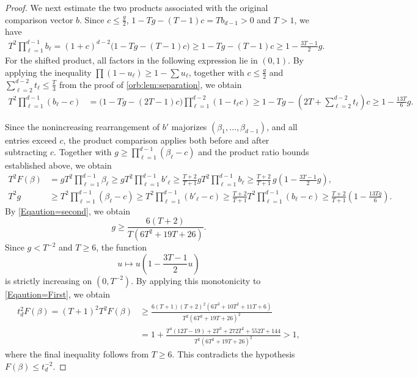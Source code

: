 \documentclass[reqno, 11pt]{article}
\numberwithin{equation}{section}
\theoremstyle{definition}
\begin{document}
\begin{proof}
We next estimate the two products associated with the original comparison vector $b$. Since $c\le \frac{g}{2}$, $1-Tg-(T-1)c=Tb_{d-1}>0$ and $T>1$, we have
\[
\begin{aligned}
T^2\prod_{\ell=1}^{d-1}b_\ell=(1+c)^{d-2}\bigl(1-Tg-(T-1)c\bigr)\ge 1-Tg-(T-1)c\ge 1-\frac{3T-1}{2}g.
\end{aligned}
\]
For the shifted product, all factors in the following expression lie in $(0,1)$. By applying the inequality $\prod(1-u_\ell)\ge1-\sum u_\ell$, together with $c\le \frac{g}{2}$ and $\sum_{\ell=2}^{d-2}t_\ell\le \frac{T}{3}$ from the proof of \cref{orb:lem:separation}, we obtain
\[
\begin{aligned}
T^2\prod_{\ell=1}^{d-1}(b_\ell-c)&=\bigl(1-Tg-(2T-1)c\bigr)
\prod_{\ell=1}^{d-2}(1-t_\ell c)\ge 1-Tg-\left(2T+\sum_{\ell=2}^{d-2}t_\ell\right)c\ge 1-\frac{13T}{6}g.
\end{aligned}
\]



Since the nonincreasing rearrangement of $b'$ majorizes
$(\beta_1,\ldots,\beta_{d-1})$, and all entries exceed $c$,
the product comparison applies both before and after
subtracting $c$. Together with $g\ge\prod_{\ell=1}^{d-1}(\beta_\ell-c)$ and the product ratio bounds
established above, we obtain 
\begin{align}
 T^2F(\beta)&=gT^{2}\prod_{\ell=1}^{d-1}\beta_\ell\ge gT^{2}\prod_{\ell=1}^{d-1}b'_\ell\ge \frac{T+2}{T+1}gT^{2}\prod_{\ell=1}^{d-1}b_\ell\ge\frac{T+2}{T+1}\,g
       \left(1-\frac{3T-1}{2}g\right), \label{Eqaution=First}\\
 T^2g&\ge T^2\prod_{\ell=1}^{d-1}(\beta_\ell-c)\ge T^2\prod_{\ell=1}^{d-1}(b'_\ell-c)\ge \frac{T+2}{T+1}T^2\prod_{\ell=1}^{d-1}(b_\ell-c)\ge\frac{T+2}{T+1}
       \left(1-\frac{13Tg}{6}\right).\label{Eqaution=second}
\end{align}
By \eqref{Eqaution=second}, we obtain 
\[
g\ge\frac{6(T+2)}{T(6T^2+19T+26)}.
\]
Since $g<T^{-2}$ and $T\ge6$, the function
\[
u\longmapsto u\left(1-\frac{3T-1}{2}u\right)
\]
is strictly increasing on $(0,T^{-2})$. By applying this monotonicity to \eqref{Eqaution=First}, we obtain
\[
\begin{aligned}
t_d^2F(\beta)=(T+1)^2T^2F(\beta)&\ge
\frac{6(T+1)(T+2)^2
(6T^3+10T^2+11T+6)}
{T^2(6T^2+19T+26)^2}\\
&=
1+\frac{
T^4(12T-19)+2T^3+272T^2+552T+144
}{
T^2(6T^2+19T+26)^2
}>1,
\end{aligned}
\]
where the final inequality follows from $T\ge6$. This contradicts the hypothesis $F(\beta)\le t_d^{-2}$.

\end{proof}
\end{document}

